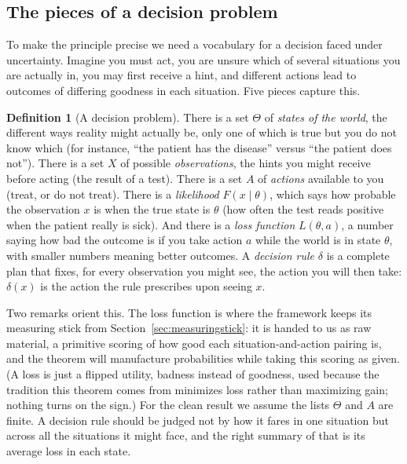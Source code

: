 \documentclass[10pt]{article}
\theoremstyle{definition}
\newtheorem{definition}[theorem]{Definition}
\theoremstyle{remark}
\begin{document}
\subsection{The pieces of a decision problem}

To make the principle precise we need a vocabulary for a decision faced under uncertainty. Imagine you must act, you are unsure which of several situations you are actually in, you may first receive a hint, and different actions lead to outcomes of differing goodness in each situation. Five pieces capture this.

\begin{definition}[A decision problem]
\label{def:decprob}
There is a set $\Theta$ of \emph{states of the world}, the different ways reality might actually be, only one of which is true but you do not know which (for instance, ``the patient has the disease'' versus ``the patient does not''). There is a set $X$ of possible \emph{observations}, the hints you might receive before acting (the result of a test). There is a set $A$ of \emph{actions} available to you (treat, or do not treat). There is a \emph{likelihood} $F(x \mid \theta)$, which says how probable the observation $x$ is when the true state is $\theta$ (how often the test reads positive when the patient really is sick). And there is a \emph{loss function} $L(\theta, a)$, a number saying how bad the outcome is if you take action $a$ while the world is in state $\theta$, with smaller numbers meaning better outcomes. A \emph{decision rule} $\delta$ is a complete plan that fixes, for every observation you might see, the action you will then take: $\delta(x)$ is the action the rule prescribes upon seeing $x$.
\end{definition}

Two remarks orient this. The loss function is where the framework keeps its measuring stick from Section~\ref{sec:measuringstick}: it is handed to us as raw material, a primitive scoring of how good each situation-and-action pairing is, and the theorem will manufacture probabilities while taking this scoring as given. (A loss is just a flipped utility, badness instead of goodness, used because the tradition this theorem comes from minimizes loss rather than maximizing gain; nothing turns on the sign.) For the clean result we assume the lists $\Theta$ and $A$ are finite. A decision rule should be judged not by how it fares in one situation but across all the situations it might face, and the right summary of that is its average loss in each state.
\end{document}
